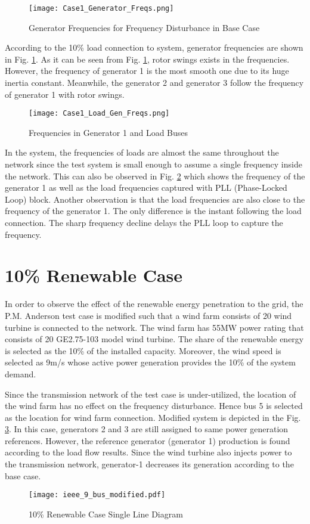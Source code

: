 \begin{figure}[h]
	\centering
	\texttt{[image: Case1\_Generator\_Freqs.png]}
	\caption{Generator Frequencies for Frequency Disturbance in Base Case}
	\label{genfreqcase1}
\end{figure}
According to the 10\% load connection to system, generator frequencies are shown in Fig. \ref{genfreqcase1}. As it can be seen from Fig. \ref{genfreqcase1}, rotor swings exists in the frequencies. However, the frequency of generator 1 is the most smooth one due to its huge inertia constant. Meanwhile, the generator 2 and generator 3 follow the frequency of generator 1 with rotor swings.\par
\begin{figure}[h!]
	\centering
	\texttt{[image: Case1\_Load\_Gen\_Freqs.png]}
	\caption{Frequencies in Generator 1 and Load Buses}
	\label{genfreqcase1_loadgen}
\end{figure}
In the system, the frequencies of loads are almost the same throughout the network since the test system is small enough to assume a single frequency inside the network. This can also be observed in Fig. \ref{genfreqcase1_loadgen} which shows the frequency of the generator 1 as well as the load frequencies captured with PLL (Phase-Locked Loop) block. Another observation is that the load frequencies are also close to the frequency of the generator 1. The only difference is the instant following the load connection. The sharp frequency decline delays the PLL loop to capture the frequency.
\section{10\% Renewable Case}
\label{sec:kmodified}
In order to observe the effect of the renewable energy penetration to the grid, the P.M. Anderson test case is modified such that a wind farm consists of 20 wind turbine is connected to the network. The wind farm has 55MW power rating that consists of 20 GE2.75-103 model wind turbine. The share of the renewable energy is selected as the 10\% of the installed capacity. Moreover, the wind speed is selected as 9m/s whose active power generation provides the 10\% of the system demand. \par 
Since the transmission network of the test case is under-utilized, the location of the wind farm has no effect on the frequency disturbance. Hence bus 5 is selected as the location for wind farm connection. Modified system is depicted in the Fig. \ref{ieee_9_bus_case2}. In this case, generators 2 and 3 are still assigned to same power generation references. However, the reference generator (generator 1) production is found according to the load flow results. Since the wind turbine also injects power to the transmission network, generator-1 decreases its generation according to the base case.
\begin{figure}[h!]
	\centering
	\texttt{[image: ieee\_9\_bus\_modified.pdf]}
	\caption{10\% Renewable Case Single Line Diagram}
	\label{ieee_9_bus_case2}
\end{figure}
